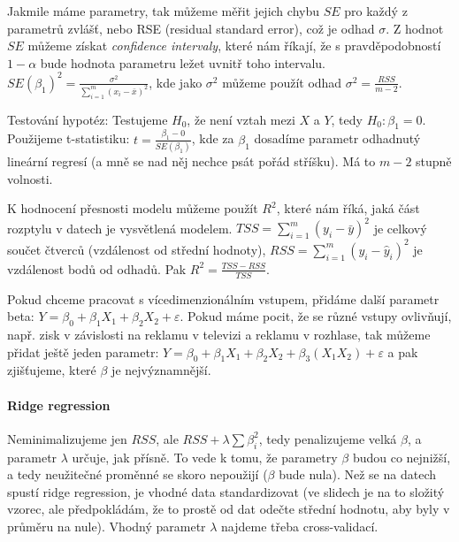\begin{figure}[ht!]
\centering
{}
\end{figure}

Jakmile máme parametry, tak můžeme měřit jejich chybu $SE$ pro každý z parametrů zvlášť, nebo RSE (residual standard error), což je odhad $\sigma$. Z hodnot $SE$ můžeme získat \textit{confidence intervaly}, které nám říkají, že s pravděpodobností $1-\alpha$ bude hodnota parametru ležet uvnitř toho intervalu. $SE(\beta_1)^2 = \frac{\sigma^2}{\sum_{i=1}^m(x_i-\bar{x})^2}$, kde jako $\sigma^2$ můžeme použít odhad $\sigma^2 = \frac{RSS}{m-2}$.

Testování hypotéz: Testujeme $H_0$, že není vztah mezi $X$ a $Y$, tedy $H_0: \beta_1 = 0$. Použijeme t-statistiku: $t = \frac{\beta_1 - 0}{SE(\beta_1)}$, kde za $\beta_1$ dosadíme parametr odhadnutý lineární regresí (a mně se nad něj nechce psát pořád stříšku). Má to $m-2$ stupně volnosti.

K hodnocení přesnosti modelu můžeme použít $R^2$, které nám říká, jaká část rozptylu v datech je vysvětlená modelem. $TSS = \sum_{i=1}^m(y_i - \bar{y})^2$ je celkový součet čtverců (vzdálenost od střední hodnoty), $RSS = \sum_{i=1}^m(y_i - \hat{y}_i)^2$ je vzdálenost bodů od odhadů. Pak $R^2 = \frac{TSS - RSS}{TSS}$.

Pokud chceme pracovat s vícedimenzionálním vstupem, přidáme další parametr beta:  $Y = \beta_0 + \beta_1 X_1 + \beta_2 X_2 + \varepsilon$. Pokud máme pocit, že se různé vstupy ovlivňují, např. zisk v závislosti na reklamu v televizi a reklamu v rozhlase, tak můžeme přidat ještě jeden parametr: $Y = \beta_0 + \beta_1 X_1 + \beta_2 X_2 + \beta_3 (X_1 X_2) + \varepsilon$ a pak zjišťujeme, které $\beta$ je nejvýznamnější.

\paragraph{Ridge regression}
Neminimalizujeme jen $RSS$, ale $RSS + \lambda\sum\beta_i^2$, tedy penalizujeme velká $\beta$, a parametr $\lambda$ určuje, jak přísně. To vede k tomu, že parametry $\beta$ budou co nejnižší, a tedy neužitečné proměnné se skoro nepoužijí ($\beta$ bude nula). Než se na datech spustí ridge regression, je vhodné data standardizovat (ve slidech je na to složitý vzorec, ale předpokládám, že to prostě od dat odečte střední hodnotu, aby byly v průměru na nule). Vhodný parametr $\lambda$ najdeme třeba cross-validací.

